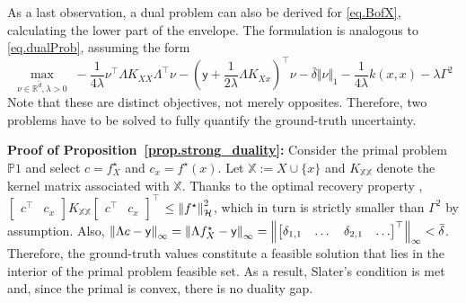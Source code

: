 \begin{my_proof}
	As a last observation, a dual problem can also be derived for \eqref{eq.BofX}, calculating the lower part of the envelope. The formulation is analogous to \eqref{eq.dualProb}, assuming the form
		\begin{equation}
			\max_{\nu \in \mathbb{R}^{\tilde d}, \lambda > 0}\; -\frac{1}{4\lambda} \nu^\top \Lambda K_{XX} \Lambda^\top \nu - \left(\mathsf{y} + \frac{1}{2\lambda} \Lambda K_{Xx} \right)^\top \nu - \bar \delta \Vert \nu \Vert_1 - \frac{1}{4\lambda} k(x,x) - \lambda \Gamma^2
		\end{equation}
	Note that these are distinct objectives, not merely opposites. Therefore, two problems have to be solved to fully quantify the ground-truth uncertainty.
\end{my_proof} 

\begin{my_proof}
	\textbf{Proof of Proposition~\ref{prop.strong_duality}:}
	Consider the primal problem $\mathds{P}1$ and select $c = f^\star_X$ and $c_x = f^\star(x)$. Let $\mathds{X} := X \cup \{x\}$ and $K_{\mathds{X}\mathds{X}}$ denote the kernel matrix associated with $\mathds{X}$. Thanks to the optimal recovery property \cite[Theorem 13.2]{wendland2004scattered}, $\begin{bmatrix} c^\top & c_x \end{bmatrix} K_{\mathds{X}\mathds{X}} \begin{bmatrix} c^\top & c_x \end{bmatrix}^\top$ $\leq \left\| f^\star \right\|_\mathcal{H}^2$, which in turn is strictly smaller than $\Gamma^2$ by assumption. Also, $\left\| \Lambda c - \mathsf{y} \right\|_\infty = \left\| \Lambda f^\star_X - \mathsf{y} \right\|_\infty = \left\| \begin{bmatrix} \delta_{1,1} & \dots & \delta_{2,1} & \dots \end{bmatrix}^\top \right\|_\infty < \bar \delta$. Therefore, the ground-truth values constitute a feasible solution that lies in the interior of the primal problem feasible set. As a result, Slater's condition is met and, since the primal is convex, there is no duality gap.
\end{my_proof} 

